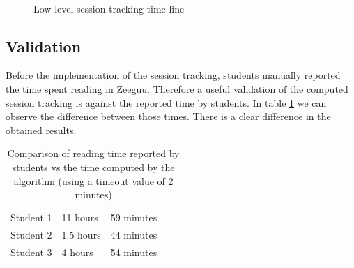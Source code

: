 \begin{figure}[!htb]
	\myfloatalign
	 \quad 
		
	 \\
	\caption{Low level session tracking time line}\label{fig:detailed_session_comparison}
\end{figure}


\subsection{Validation}
Before the implementation of the session tracking, students manually reported the time spent reading in Zeeguu. Therefore a useful validation of the computed session tracking is against the reported time by students.
In table \ref{tb:comparison_read_time} we can observe the difference between those times. There is a clear difference in the obtained results.

\begin{table}[!htb]
	\begin{tabularx}
		{\textwidth}{Xllll}\toprule
		\tableheadline{Student} & 
		\tableheadline{Reported time} &
		\tableheadline{Computed time} \\ 
		\midrule 
		Student 1
		 & 11 hours
		  & 59 minutes
		   \\ 
		\hline 
		Student 2
		 & 1.5 hours
		  & 44 minutes
		   \\ 
		\hline
		Student 3
		 & 4 hours
		  & 54 minutes
		  \\ 
		\hline 
	\end{tabularx} 
	\caption{Comparison of reading time reported by students vs the time computed by the algorithm (using a timeout value of 2 minutes)}\label{tb:comparison_read_time}
\end{table}

